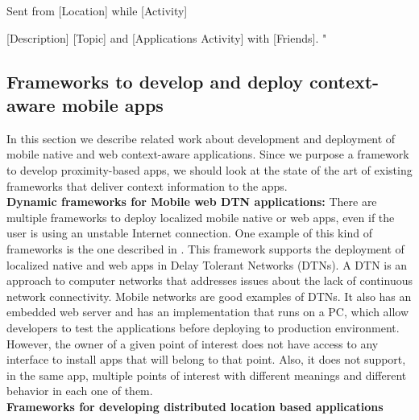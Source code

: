 Sent from [Location] while [Activity]

[Description] [Topic] and [Applications Activity] with 
[Friends].
"
\\
\subsection{Frameworks to develop and deploy 
context-aware mobile apps}
\label{sub:frameworks_context_aware}
In this section we describe related work about
development and deployment of mobile native and web 
context-aware applications.
Since we purpose a framework to develop
proximity-based apps, we should look at the state
of the art of existing frameworks that deliver
context information to the apps.
\\
\textbf{Dynamic frameworks for Mobile web DTN applications:}
There are multiple frameworks to deploy localized
mobile native or web apps, even if the user is using an
unstable Internet connection. One example of this
kind of frameworks is the one
described in \cite{Sankaran2014}.
This framework supports the deployment of localized 
native and
web apps in Delay Tolerant Networks (DTNs).
A DTN is an approach to computer networks that 
addresses issues about the lack of continuous network
connectivity. Mobile networks are good examples of DTNs. 
It also has an embedded web server 
and has an implementation that runs on a PC, which allow
developers to test the applications before deploying
to production environment.
However, the owner of a given point of interest does not
have access to any interface to install apps that will
belong to that point. Also, it does not support, in the
same app, multiple points of interest with different
meanings and different behavior in each one of them.
\\
\textbf{Frameworks for developing distributed
location based applications}
